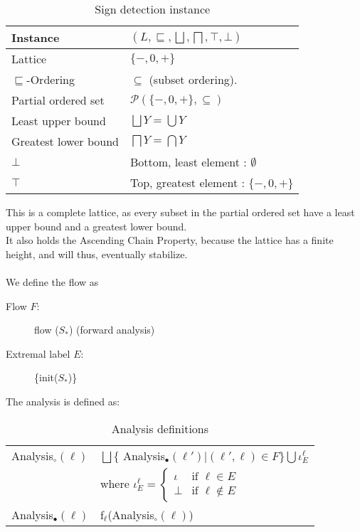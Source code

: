 \begin{table}[H]
\begin{tabular}{| l | l |}
  \hline
  Instance & $(L,\sqsubseteq,\bigsqcup, \bigsqcap, \top, \bot )$ \\
  \hline
  \hline
  Lattice  & $\{-,0,+\}$ \\
  \hline
  $\sqsubseteq$-Ordering  &  $\subseteq$ (subset ordering).\\
  \hline
  Partial ordered set    & $\mathcal{P}(\{-,0,+\}, \subseteq)$ \\
  \hline
  Least upper bound      & $\bigsqcup Y = \bigcup Y$\\
  \hline
  Greatest lower bound   & $\bigsqcap Y = \bigcap Y$\\
  \hline
  $\bot$                 & Bottom, least element : $\emptyset$\\
  \hline
  $\top$                 & Top, greatest element : $\{-,0,+\}$\\
\hline   
\end{tabular}
  \centering
  \caption{Sign detection instance}
  \label{table:sign_detection_instance}
\end{table}
\noindent This is a complete lattice, as every subset in the partial ordered set have a least upper bound and a greatest lower bound.\\
It also holds the Ascending Chain Property, because the lattice has a finite height, and will thus, eventually stabilize.\\\\
We define the flow as 
\begin{description}
  \item[Flow $F$:] flow ($S_*$) (forward analysis)
  \item[Extremal label $E$:] \{init($S_*$)\}
\end{description}
The analysis is defined as:
\begin{table}[H]
\begin{tabular}{| l | l |}
  \hline
  Analysis$_\circ(\ell)$ & $ \bigsqcup \{$ Analysis$_\bullet (\ell') | (\ell', \ell) \in F \} \bigcup \iota_E^{\ell} $ \\
                         & where $\iota_E^{\ell} = \begin{cases} \iota & \text{if } \ell \in E \\ 
                                                                 \bot  & \text{if } \ell \notin E
                                                   \end{cases}$\\
  \hline
  Analysis$_\bullet(\ell)$ & f$_\ell$(Analysis$_\circ(\ell)$)\\
  \hline
\end{tabular}
\centering
\caption{Analysis definitions}
\end{table}


